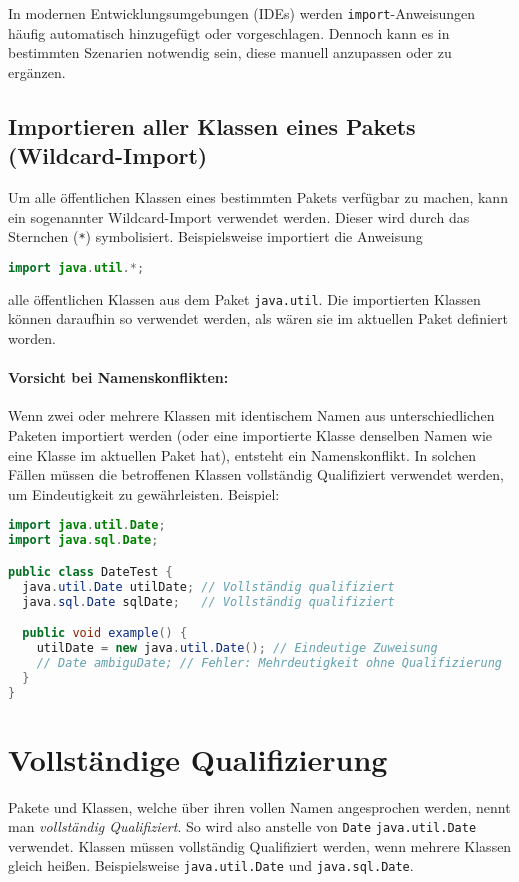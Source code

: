 In modernen Entwicklungsumgebungen (IDEs) werden \texttt{import}-Anweisungen häufig automatisch hinzugefügt oder vorgeschlagen. 
Dennoch kann es in bestimmten Szenarien notwendig sein, diese manuell anzupassen oder zu ergänzen.

\subsection{Importieren aller Klassen eines Pakets (Wildcard-Import)}
\label{ssec:wildcard_import}

Um alle öffentlichen Klassen eines bestimmten Pakets verfügbar zu machen, kann ein sogenannter Wildcard-Import verwendet werden. 
Dieser wird durch das Sternchen (\texttt{*}) symbolisiert. Beispielsweise importiert die Anweisung
\begin{lstlisting}[language=Java, caption={Wildcard-Import des java.util Pakets}]
import java.util.*;
\end{lstlisting}
alle öffentlichen Klassen aus dem Paket \texttt{java.util}. Die importierten Klassen können daraufhin so verwendet werden, 
als wären sie im aktuellen Paket definiert worden.

\paragraph{Vorsicht bei Namenskonflikten:}
Wenn zwei oder mehrere Klassen mit identischem Namen aus unterschiedlichen Paketen importiert werden 
(oder eine importierte Klasse denselben Namen wie eine Klasse im aktuellen Paket hat), entsteht ein Namenskonflikt. 
In solchen Fällen müssen die betroffenen Klassen vollständig Qualifiziert verwendet werden, um Eindeutigkeit zu gewährleisten.
Beispiel:
\begin{lstlisting}[language=Java, caption={Umgang mit Namenskonflikten}]
import java.util.Date;
import java.sql.Date;

public class DateTest {
  java.util.Date utilDate; // Vollständig qualifiziert
  java.sql.Date sqlDate;   // Vollständig qualifiziert

  public void example() {
    utilDate = new java.util.Date(); // Eindeutige Zuweisung
    // Date ambiguDate; // Fehler: Mehrdeutigkeit ohne Qualifizierung
  }
}
\end{lstlisting}

\section{Vollständige Qualifizierung}
Pakete und Klassen, welche über ihren vollen Namen angesprochen werden, nennt man 
\textit{vollständig Qualifiziert}. So wird also anstelle von \lstinline{Date} 
\lstinline{java.util.Date} verwendet. Klassen müssen vollständig Qualifiziert werden,
wenn mehrere Klassen gleich heißen. Beispielsweise \lstinline{java.util.Date} und 
\lstinline{java.sql.Date}. 

